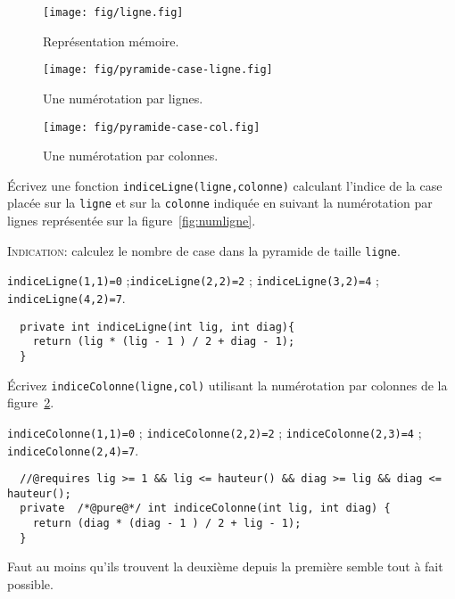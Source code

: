 \documentclass[10pt]{article}\usepackage[correction,nu]{esial}
\begin{document}
\begin{figure}[h]
  \centering
  \texttt{[image: fig/ligne.fig]}\vspace{-.5\baselineskip}
  \caption{Représentation mémoire.}
  \label{fig:mem}\vspace{-1.5\baselineskip}
\end{figure}

\begin{figure}[h]
  \begin{minipage}{.45\linewidth}
    \centering
    \texttt{[image: fig/pyramide-case-ligne.fig]}\vspace{-.5\baselineskip}
    \caption{Une numérotation par lignes.}
    \label{fig:numligne}
  \end{minipage}\hfill%
  \begin{minipage}{.45\linewidth}
    \centering
    \texttt{[image: fig/pyramide-case-col.fig]}\vspace{-.5\baselineskip}
    \caption{Une numérotation par colonnes.}
    \label{fig:numcol}
  \end{minipage}\vspace{-1\baselineskip}
\end{figure}

\begin{Question}
  Écrivez une fonction \texttt{indiceLigne(ligne,colonne)} calculant l'indice de la
  case placée sur la \texttt{ligne} et sur la \texttt{colonne} indiquée en
  suivant la numérotation par lignes représentée sur la
  figure~\ref{fig:numligne}.

  \noindent\textsc{Indication:} calculez le nombre de case dans la pyramide de
  taille \texttt{ligne}.

  \noindent\texttt{indiceLigne(1,1)=0} ;\hfill\texttt{indiceLigne(2,2)=2} ;
  \hfill\texttt{indiceLigne(3,2)=4} ; \hfill\texttt{indiceLigne(4,2)=7}. 
\end{Question}
\begin{Reponse}
\begin{verbatim}
  private int indiceLigne(int lig, int diag){
    return (lig * (lig - 1 ) / 2 + diag - 1);
  }
\end{verbatim}
\end{Reponse}


\begin{Question}
  Écrivez \texttt{indiceColonne(ligne,col)} utilisant la numérotation par
  colonnes de la figure~\ref{fig:numcol}.

  \noindent\texttt{indiceColonne(1,1)=0} ; \hfill\texttt{indiceColonne(2,2)=2} ;
  \hfill\texttt{indiceColonne(2,3)=4} ; \hfill\texttt{indiceColonne(2,4)=7}.
\end{Question}
\begin{Reponse}
\begin{verbatim}
  //@requires lig >= 1 && lig <= hauteur() && diag >= lig && diag <= hauteur();
  private  /*@pure@*/ int indiceColonne(int lig, int diag) {
    return (diag * (diag - 1 ) / 2 + lig - 1);
  }\end{verbatim}%

Faut au moins qu'ils trouvent la deuxième depuis la première semble tout à fait
possible.
\end{Reponse}
\end{document}
